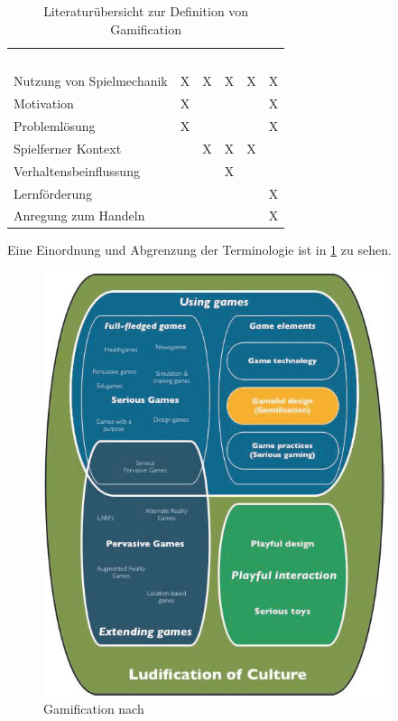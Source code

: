 \begin{table}
\footnotesize
\begin{tabular}{llllll}
~ & \textcite{Zichermann.2011} & \textcite{Deterding.2011} & \textcite{Breuer.2011} & \textcite{Oxford.2013} & \textcite{Kapp.2012} \\
Nutzung von Spielmechanik & X & X & X & X & X \\
Motivation & X & ~ & ~ & ~ & X \\
Problemlösung & X & ~ & ~ & ~ & X \\
Spielferner Kontext & ~ & X & X & X & ~ \\
Verhaltensbeinflussung & ~ & ~ & X & ~ & ~ \\
Lernförderung & ~ & ~ & ~ & ~ & X \\
Anregung zum Handeln & ~ & ~ & ~ & ~ & X \\
\end{tabular}
\label{table:ch3:lit_overview}
\caption{Literaturübersicht zur Definition von Gamification}
\end{table}

Eine Einordnung und Abgrenzung der Terminologie ist in \ref{img:ch3_img02_gamification} zu sehen.

\begin{figure}[H]
\begin{center}
\includegraphics[width=100mm]{images/ch3_img02_gamification.png}
\caption{Gamification nach \textcite{Deterding.2011}}
\label{img:ch3_img02_gamification}
\end{center}
\end{figure}

